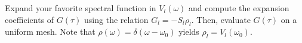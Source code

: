 \documentclass[submission, LectureNotes]{SciPost}
\newcommand\ee{\mathrm{e}}%
\newcommand\ii{\mathrm{i}}%
\newcommand\iw{\ii\omega}%
\begin{document}

\begin{Exercise}
    Expand your favorite spectral function in $V_l(\omega)$ and compute the expansion coefficients
    of $G(\tau)$ using the relation $G_l = -S_l \rho_l$.
    Then, evaluate $G(\tau)$ on a uniform mesh.
    Note that $\rho(\omega) = \delta(\omega-\omega_0)$ yields $\rho_l = V_l(\omega_0)$.
\end{Exercise}

%


%
\end{document}
